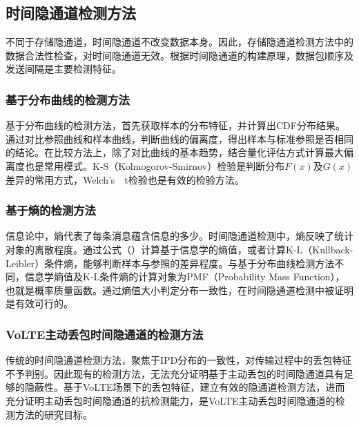 \subsection{时间隐通道检测方法}
\label{sec:intro:background:detect}

不同于存储隐通道，时间隐通道不改变数据本身。因此，存储隐通道检测方法中的数据合法性检查，对时间隐通道无效。根据时间隐通道的构建原理，数据包顺序及发送间隔是主要检测特征。

\subsubsection{基于分布曲线的检测方法}
基于分布曲线的检测方法，首先获取样本的分布特征，并计算出CDF分布结果。通过对比参照曲线和样本曲线，判断曲线的偏离度，得出样本与标准参照是否相同的结论。在比较方法上，除了对比曲线的基本趋势，结合量化评估方式计算最大偏离度也是常用模式。K-S（Kolmogorov-Smirnov）检验是判断分布$F(x)$及$G(x)$差异的常用方式，{Welch's\ \ t检验}也是有效的检验方法。

\subsubsection{基于熵的检测方法}

信息论中，熵代表了每条消息蕴含信息的多少。时间隐通道检测中，熵反映了统计对象的离散程度。通过公式（）计算基于信息学的熵值，或者计算K-L（Kullback-Leibler）条件熵，能够判断样本与参照的差异程度。与基于分布曲线检测方法不同，信息学熵值及K-L条件熵的计算对象为PMF（Probability Mass Function），也就是概率质量函数。通过熵值大小判定分布一致性，在时间隐通道检测中被证明是有效可行的。

\subsubsection{VoLTE主动丢包时间隐通道的检测方法}
传统的时间隐通道检测方法，聚焦于IPD分布的一致性，对传输过程中的丢包特征不予判别。因此现有的检测方法，无法充分证明基于主动丢包的时间隐通道具有足够的隐蔽性。基于VoLTE场景下的丢包特征，建立有效的隐通道检测方法，进而充分证明主动丢包时间隐通道的抗检测能力，是VoLTE主动丢包时间隐通道的检测方法的研究目标。
